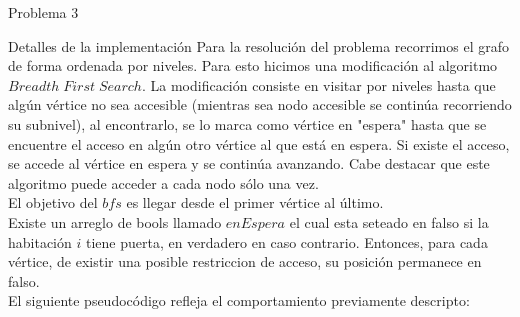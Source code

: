 \begin{section}{Problema 3}
\begin{subsection}{Detalles de la implementación}
		Para la resolución del problema recorrimos el grafo de forma ordenada por niveles. Para esto hicimos una modificación al algoritmo $Breadth\; First\; Search$. La modificación consiste en visitar por niveles hasta que algún vértice no sea accesible (mientras sea nodo accesible se continúa recorriendo su subnivel), al encontrarlo, se lo marca como vértice en "espera" hasta que se encuentre el acceso en algún otro vértice al que está en espera. Si existe el acceso, se accede al vértice en espera y se continúa avanzando. Cabe destacar que este algoritmo puede acceder a cada nodo sólo una vez.\\ 

		El objetivo del $bfs$ es llegar desde el primer vértice al último.\\

		Existe un arreglo de bools llamado $enEspera$ el cual esta seteado en falso si la habitación $i$ tiene puerta, en verdadero en caso contrario. Entonces, para cada vértice, de existir una posible restriccion de acceso, su posición permanece en falso.\\
		
		El siguiente pseudocódigo refleja el comportamiento previamente descripto:\\


\end{subsection}
\end{section}
